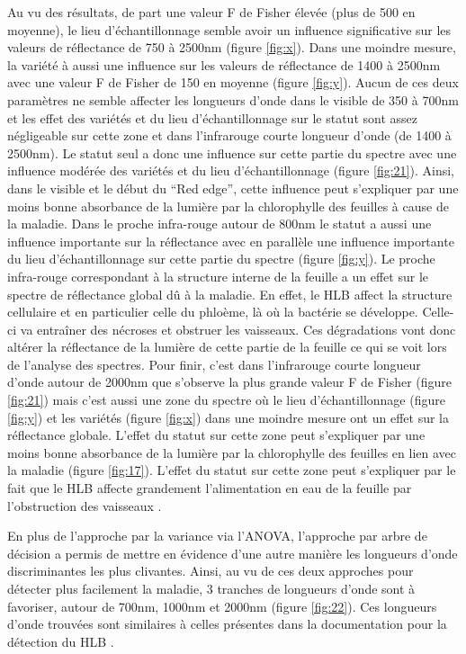 \documentclass[
  11pt,
  french,
  a4paper,
  extrafontsizes,onecolumn,openright
  ]{memoir}
\begin{document}
Au vu des résultats, de part une valeur F de Fisher élevée (plus de 500 en moyenne), le lieu d'échantillonnage semble avoir un influence significative sur les valeurs de réflectance de 750 à 2500nm (figure \ref{fig:x}). Dans une moindre mesure, la variété à aussi une influence sur les valeurs de réflectance de 1400 à 2500nm avec une valeur F de Fisher de 150 en moyenne (figure \ref{fig:y}). Aucun de ces deux paramètres ne semble affecter les longueurs d'onde dans le visible de 350 à 700nm et les effet des variétés et du lieu d'échantillonnage sur le statut sont assez négligeable sur cette zone et dans l'infrarouge courte longueur d'onde (de 1400 à 2500nm).
Le statut seul a donc une influence sur cette partie du spectre avec une influence modérée des variétés et du lieu d'échantillonnage (figure \ref{fig:21}). Ainsi, dans le visible et le début du ``Red edge'', cette influence peut s'expliquer par une moins bonne absorbance de la lumière par la chlorophylle des feuilles à cause de la maladie.
Dans le proche infra-rouge autour de 800nm le statut a aussi une influence importante sur la réflectance avec en parallèle une influence importante du lieu d'échantillonnage sur cette partie du spectre (figure \ref{fig:y}).
Le proche infra-rouge correspondant à la structure interne de la feuille a un effet sur le spectre de réflectance global dû à la maladie. En effet, le HLB affect la structure cellulaire et en particulier celle du phloème, là où la bactérie se développe. Celle-ci va entraîner des nécroses et obstruer les vaisseaux. Ces dégradations vont donc altérer la réflectance de la lumière de cette partie de la feuille ce qui se voit lors de l'analyse des spectres.
Pour finir, c'est dans l'infrarouge courte longueur d'onde autour de 2000nm que s'observe la plus grande valeur F de Fisher (figure \ref{fig:21}) mais c'est aussi une zone du spectre où le lieu d'échantillonnage (figure \ref{fig:y}) et les variétés (figure \ref{fig:x}) dans une moindre mesure ont un effet sur la réflectance globale. L'effet du statut sur cette zone peut s'expliquer par une moins bonne absorbance de la lumière par la chlorophylle des feuilles en lien avec la maladie (figure \ref{fig:17}).
L'effet du statut sur cette zone peut s'expliquer par le fait que le HLB affecte grandement l'alimentation en eau de la feuille par l'obstruction des vaisseaux \autocite{bove_huanglongbing_2006}.

En plus de l'approche par la variance via l'ANOVA, l'approche par arbre de décision a permis de mettre en évidence d'une autre manière les longueurs d'onde discriminantes les plus clivantes. Ainsi, au vu de ces deux approches pour détecter plus facilement la maladie, 3 tranches de longueurs d'onde sont à favoriser, autour de 700nm, 1000nm et 2000nm (figure \ref{fig:22}). Ces longueurs d'onde trouvées sont similaires à celles présentes dans la documentation pour la détection du HLB \autocite{mishra_spectral_2007}.
\end{document}
